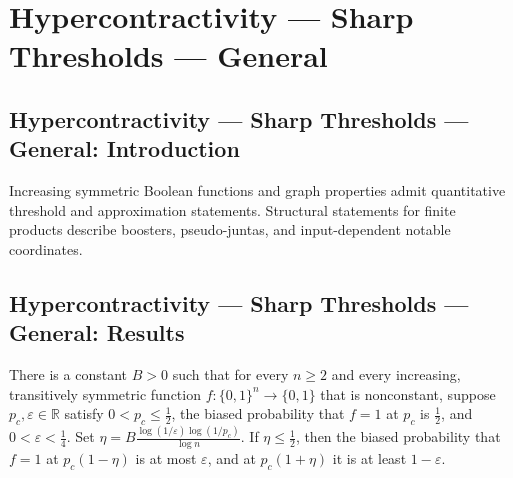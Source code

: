 \section{Hypercontractivity --- Sharp Thresholds --- General}
\subsection*{Hypercontractivity --- Sharp Thresholds --- General: Introduction}
Increasing symmetric Boolean functions and graph properties admit quantitative threshold and approximation statements. Structural statements for finite products describe boosters, pseudo-juntas, and input-dependent notable coordinates.

\subsection*{Hypercontractivity --- Sharp Thresholds --- General: Results}

\begin{theorem}
\leanok
{}
There is a constant $B>0$ such that for every $n\ge2$ and every increasing, transitively
symmetric function $f:\{0,1\}^n\to\{0,1\}$ that is nonconstant, suppose
$p_c,\varepsilon\in\mathbb R$ satisfy $0<p_c\le\tfrac12$, the biased probability that
$f=1$ at $p_c$ is $\tfrac12$, and $0<\varepsilon<\tfrac14$. Set
$\displaystyle\eta=B\frac{\log(1/\varepsilon)\log(1/p_c)}{\log n}$. If
$\eta\le\tfrac12$, then the biased probability that $f=1$ at $p_c(1-\eta)$ is at most
$\varepsilon$, and at $p_c(1+\eta)$ it is at least $1-\varepsilon$.
\end{theorem}

